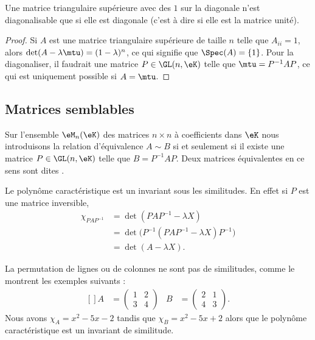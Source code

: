 \begin{lemma}
    Une matrice triangulaire supérieure avec des \( 1\) sur la diagonale n'est diagonalisable que si elle est diagonale (c'est à dire si elle est la matrice unité).
\end{lemma}

\begin{proof}
    Si \( A\) est une matrice triangulaire supérieure de taille \( n\) telle que \( A_{ii}=1\), alors \( \det(A-\lambda\mtu)=(1-\lambda)^n\), ce qui signifie que \( \Spec(A)=\{ 1 \}\). Pour la diagonaliser, il faudrait une matrice \( P\in\GL(n,\eK)\) telle que \( \mtu=P^{-1}AP\), ce qui est uniquement possible si \( A=\mtu\).
\end{proof}

\subsection{Matrices semblables}

\begin{definition} \label{DefCQNFooSDhDpB}
    Sur l'ensemble \( \eM_n(\eK)\) des matrices \( n\times n\) à coefficients dans \(\eK\) nous introduisons la relation d'équivalence \( A\sim B\) si et seulement si il existe une matrice \( P\in\GL(n,\eK)\) telle que \( B=P^{-1}AP\). Deux matrices équivalentes en ce sens sont dites .
\end{definition}

Le polynôme caractéristique est un invariant sous les similitudes. En effet si \( P\) est une matrice inversible,
\begin{subequations}
    \begin{align}
        \chi_{PAP^{-1}}&=\det(PAP^{-1}-\lambda X)\\
        &=\det\big( P^{-1}(PAP^{-1}-\lambda X)P^{-1} \big)\\
        &=\det(A-\lambda X).
    \end{align}
\end{subequations}

La permutation de lignes ou de colonnes ne sont pas de similitudes, comme le montrent les exemples suivants :
\begin{equation}
    \begin{aligned}[]
        A&=\begin{pmatrix}
            1    &   2    \\ 
            3    &   4    
        \end{pmatrix}&
        B&=\begin{pmatrix}
            2    &   1    \\ 
            4    &   3    
        \end{pmatrix}.
    \end{aligned}
\end{equation}
Nous avons \( \chi_A=x^2-5x-2\) tandis que \( \chi_B=x^2-5x+2\) alors que le polynôme caractéristique est un invariant de similitude.

